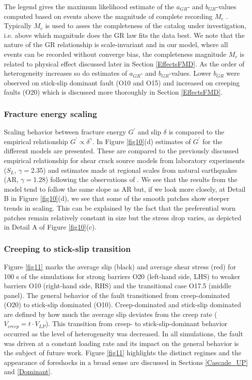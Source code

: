 \documentclass[preprint,1p, 10pt,authoryear]{elsarticle}
\begin{document}
The legend gives the maximum likelihood estimate of the $a_{GR}$- and $b_{GR}$-values computed based on events above the magnitude of complete recording $M_{c}$ \citep{Wiemer2002}. Typically $M_{c}$ is used to asses the completeness of the catalog under investigation, i.e. above which magnitude does the GR law fits the data best. We note that the nature of the GR relationship is scale-invariant and in our model, where all events can be recorded without converge bias, the completeness magnitude $M_{c}$ is related to physical effect discussed later in Section \ref{EffectsFMD}. As the order of heterogeneity increases so do estimates of $a_{GR}$- and $b_{GR}$-values. Lower $b_{GR}$ were observed on stick-slip dominant fault (O10 and O15) and increased on creeping faults (O20) which is discussed more thoroughly in Section \ref{EffectsFMD}.

\subsubsection{Fracture energy scaling}
\label{FracEnergy}
Scaling behavior between fracture energy $G^{'}$ and slip $\delta$  is compared to the  empirical relationship $G^{'} \propto \delta^{\gamma}$. In Figure \ref{fig10}(d) estimates of $G^{'}$ for the different models are presented. These are compared to the previously discussed empirical relationship for shear crack source models from laboratory experiments ($S_{L}$, $\gamma = $2.35) \citep{Selvadurai2019}  and estimates made at regional scales from natural earthquakes (AR, $\gamma = $1.28) following the observations of \citet{Abercrombie2005} \citep[see also][]{Mai2006}.  We see that the results from the model tend to follow the same slope as AR but, if we look more closely, at Detail B in Figure \ref{fig10}(d), we see that some of the smooth patches show steeper trends in scaling. This can be explained by the fact that the preferential worn patches remain relatively constant in size but the stress drop varies, as depicted in Detail A of Figure \ref{fig10}(c).

\subsubsection{Creeping to stick-slip transition}
\label{Recurrence times}
Figure \ref{fig11} marks the average slip (black) and average shear stress (red) for 100 s of the simulations for strong barriers O20 (left-hand side, LHS) to weaker barriers O10 (right-hand side, RHS) and the transitional case O17.5 (middle panel). The general behavior of the fault transitioned from creep-dominated (O20) to stick-slip dominated (O10). Creep-dominated and stick-slip dominated are defined by how much the average slip deviates from the creep rate ($V_{creep} = t\cdot V_{LP}$). This transition from creep- to stick-slip-dominant behavior occurred as the level of heterogeneity was decreased. In all simulations, the fault was driven at a constant loading rate and its impact on the general behavior is the subject of future work.  Figure \ref{fig11} highlights the distinct regimes and the appearance of foreshocks in a broad sense \citep{Mogi1963, Mogi1985} are discussed in Sections \ref{Cascade_UP} and \ref{Dominant}.
\end{document}
